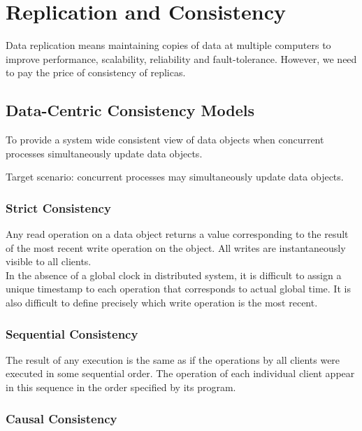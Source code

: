 \chapter{Replication and Consistency}
\begin{multicols*}{2}

\noindent Data replication means maintaining copies of data at multiple computers to improve performance, scalability, reliability and fault-tolerance. However, we need to pay the price of consistency of replicas.

\section{Data-Centric Consistency Models}

\noindent To provide a system wide consistent view of data objects when concurrent processes simultaneously update data objects.

\noindent Target scenario: concurrent processes may simultaneously update data objects.

\subsection{Strict Consistency}

\noindent Any read operation on a data object returns a value corresponding to the result of the most recent write operation on the object. All writes are instantaneously visible to all clients. \\

\noindent In the absence of a global clock in distributed system, it is difficult to assign a unique timestamp to each operation that corresponds to actual global time. It is also difficult to define precisely which write operation is the most recent.

\subsection{Sequential Consistency}

\noindent The result of any execution is the same as if the operations by all clients were executed in some sequential order. The operation of each individual client appear in this sequence in the order specified by its program.

\subsection{Causal Consistency}


\end{multicols*}
